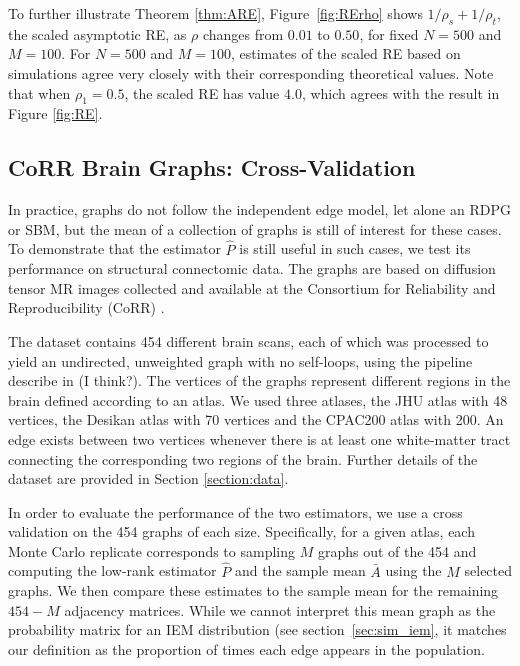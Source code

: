\documentclass[a4paper]{article}
\begin{document}
To further illustrate Theorem \ref{thm:ARE}, Figure~\ref{fig:RErho} shows $1/\rho_s + 1/\rho_t$, the scaled asymptotic RE, as $\rho$ changes from $0.01$ to $0.50$, for fixed $N=500$ and $M=100$.
For $N=500$ and $M=100$, estimates of the scaled RE based on simulations agree very closely with their corresponding theoretical values. Note that when $\rho_1 = 0.5$, the scaled RE has value $4.0$, which agrees with the result in Figure \ref{fig:RE}.



\subsection{CoRR Brain Graphs: Cross-Validation}\label{sec:corr_data}

In practice, graphs do not follow the independent edge model, let alone an RDPG or SBM, but the mean of a collection of graphs is still of interest for these cases.
To demonstrate that the estimator $\hat{P}$ is still useful in such cases, we test its performance on structural connectomic data. 
The graphs are based on diffusion tensor MR images collected and available at the Consortium for Reliability and Reproducibility (CoRR) \citep{zuo2014open, gorgolewski2015high}.

The dataset contains 454 different brain scans, each of which was processed to yield an undirected, unweighted graph with no self-loops, using the pipeline describe in \citet{gray2012magnetic} {\color{red}(I think?)}.
The vertices of the graphs represent different regions in the brain defined according to an atlas.
We used three atlases, the JHU atlas with 48 vertices, the Desikan atlas with 70 vertices and the  CPAC200 atlas with 200.
An edge exists between two vertices whenever there is at least one white-matter tract connecting the corresponding two regions of the brain. 
Further details of the dataset are provided in Section \ref{section:data}.

In order to evaluate the performance of the two estimators, we use a cross validation on the 454 graphs of each size. 
Specifically, for a given atlas, each Monte Carlo replicate corresponds to sampling $M$ graphs out of the 454 and computing the low-rank estimator $\hat{P}$ and the sample mean $\bar{A}$ using the $M$ selected graphs. 
We then compare these estimates to the sample mean for the remaining $454-M$ adjacency matrices.
While we cannot interpret this mean graph as the probability matrix for an IEM distribution (see section~\ref{sec:sim_iem}, it matches our definition as the proportion of times each edge appears in the population.
\end{document}
